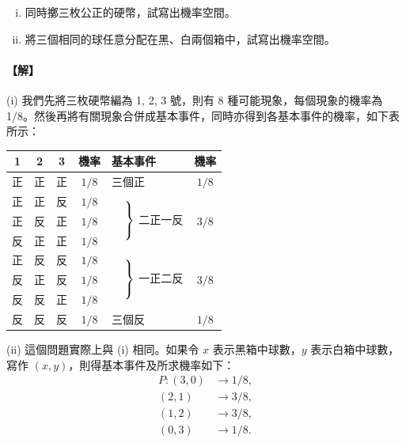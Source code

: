 \medskip
\begin{discussion}\label{disc:b5-4-2}
\begin{enumerate}[(i), leftmargin=2em, itemsep=0.3em]
  \item 同時擲三枚公正的硬幣，試寫出機率空間。
  \item 將三個相同的球任意分配在黑、白兩個箱中，試寫出機率空間。
\end{enumerate}
\end{discussion}
\paragraph{【解】}
(i) 我們先將三枚硬幣編為 1, 2, 3 號，則有 8 種可能現象，每個現象的機率為 1/8。然後再將有關現象合併成基本事件，同時亦得到各基本事件的機率，如下表所示：

\begin{center}
\renewcommand{\arraystretch}{1.2}
\begin{tabular}{cccc|lc}
\hline\hline
1 & 2 & 3 & 機率 & 基本事件 & 機率 \\
\hline
正 & 正 & 正 & $1/8$ & \hphantom{$\Big\}$} 三個正 & $1/8$ \\
正 & 正 & 反 & $1/8$ & \multirow{3}{*}{$\left.\begin{array}{c} \vphantom{A}\\ \vphantom{A}\\ \vphantom{A}\end{array}\right\}$ 二正一反} & \multirow{3}{*}{$3/8$} \\
正 & 反 & 正 & $1/8$ & & \\
反 & 正 & 正 & $1/8$ & & \\
正 & 反 & 反 & $1/8$ & \multirow{3}{*}{$\left.\begin{array}{c} \vphantom{A}\\ \vphantom{A}\\ \vphantom{A}\end{array}\right\}$ 一正二反} & \multirow{3}{*}{$3/8$} \\
反 & 正 & 反 & $1/8$ & & \\
反 & 反 & 正 & $1/8$ & & \\
反 & 反 & 反 & $1/8$ & \hphantom{$\Big\}$} 三個反 & $1/8$ \\
\hline
\end{tabular}
\end{center}

(ii) 這個問題實際上與 (i) 相同。如果令 $x$ 表示黑箱中球數，$y$ 表示白箱中球數，寫作 $(x, y)$，則得基本事件及所求機率如下：
\begin{align*}
P \colon (3, 0) &\longrightarrow 1/8, \\
(2, 1) &\longrightarrow 3/8, \\
(1, 2) &\longrightarrow 3/8, \\
(0, 3) &\longrightarrow 1/8. \tag*{\#}
\end{align*}

